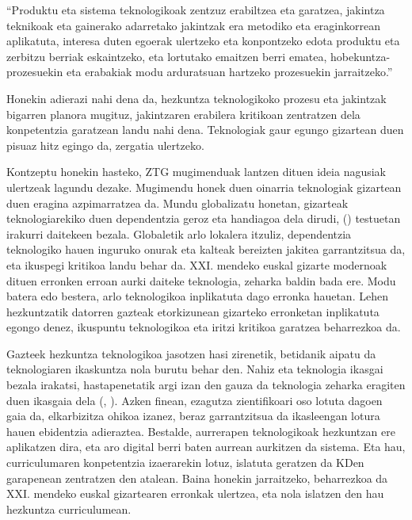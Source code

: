 \begin{adjustwidth}{3em}{0pt}
“Produktu eta sistema teknologikoak zentzuz erabiltzea eta garatzea, jakintza teknikoak eta gainerako adarretako jakintzak era metodiko eta eraginkorrean aplikatuta, interesa duten egoerak ulertzeko eta konpontzeko edota produktu eta zerbitzu berriak eskaintzeko, eta lortutako emaitzen berri ematea, hobekuntza-prozesuekin eta erabakiak modu arduratsuan hartzeko prozesuekin jarraitzeko.”
\end{adjustwidth}

Honekin adierazi nahi dena da, hezkuntza teknologikoko prozesu eta jakintzak bigarren planora mugituz, jakintzaren erabilera kritikoan zentratzen dela konpetentzia garatzean landu nahi dena. Teknologiak gaur egungo gizartean duen pisuaz hitz egingo da, zergatia ulertzeko.

Kontzeptu honekin hasteko, ZTG mugimenduak lantzen dituen ideia nagusiak ulertzeak lagundu dezake. Mugimendu honek duen oinarria teknologiak gizartean duen eragina azpimarratzea da. Mundu globalizatu honetan, gizarteak teknologiarekiko duen dependentzia geroz eta handiagoa dela dirudi, \citeauthor{osorio2002educacion} (\citeyear{osorio2002educacion}) testuetan irakurri daitekeen bezala. Globaletik arlo lokalera itzuliz, dependentzia teknologiko hauen inguruko onurak eta kalteak bereizten jakitea garrantzitsua da, eta ikuspegi kritikoa landu behar da. XXI. mendeko euskal gizarte modernoak dituen erronken erroan aurki daiteke teknologia, zeharka baldin bada ere. Modu batera edo bestera, arlo teknologikoa inplikatuta dago erronka hauetan. Lehen hezkuntzatik datorren gazteak etorkizunean gizarteko erronketan inplikatuta egongo denez, ikuspuntu teknologikoa eta iritzi kritikoa garatzea beharrezkoa da.

Gazteek hezkuntza teknologikoa jasotzen hasi zirenetik, betidanik aipatu da teknologiaren ikaskuntza nola burutu behar den. Nahiz eta teknologia ikasgai bezala irakatsi, hastapenetatik argi izan den gauza da teknologia zeharka eragiten duen ikasgaia dela (\citeauthor{gilbert1995educacion}, \citeyear{gilbert1995educacion}). Azken finean, ezagutza zientifikoari oso lotuta dagoen gaia da, elkarbizitza ohikoa izanez, beraz garrantzitsua da ikasleengan lotura hauen ebidentzia adieraztea. Bestalde, aurrerapen teknologikoak hezkuntzan ere aplikatzen dira, eta aro digital berri baten aurrean aurkitzen da sistema. Eta hau, curriculumaren konpetentzia izaerarekin lotuz, islatuta geratzen da KDen garapenean zentratzen den atalean. Baina honekin jarraitzeko, beharrezkoa da XXI. mendeko euskal gizartearen erronkak ulertzea, eta nola islatzen den hau hezkuntza curriculumean.

